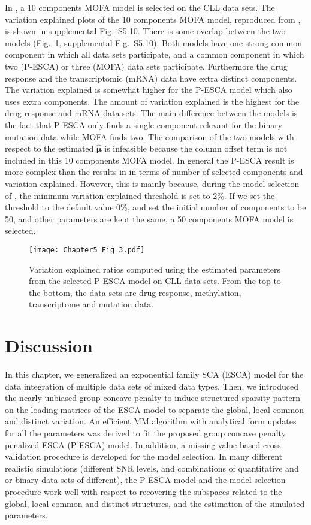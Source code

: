 In \cite{argelaguet2018multi}, a 10 components MOFA model is selected on the CLL data sets. The variation explained plots of the 10 components MOFA model, reproduced from \cite{argelaguet2018multi}, is shown in supplemental Fig.~S5.10. There is some overlap between the two models (Fig.~\ref{chapter5_fig:3}, supplemental Fig.~S5.10). Both models have one strong common component in which all data sets participate, and a common component in which two (P-ESCA) or three (MOFA) data sets participate. Furthermore the drug response and the transcriptomic (mRNA) data have extra distinct components. The variation explained is somewhat higher for the P-ESCA model which also uses extra components. The amount of variation explained is the highest for the drug response and mRNA data sets. The main difference between the models is the fact that P-ESCA only finds a single component relevant for the binary mutation data while MOFA finds two. The comparison of the two models with respect to the estimated $\hat{\bm{\mu}}$ is infeasible because the column offset term is not included in this 10 components MOFA model. In general the P-ESCA result is more complex than the results in \cite{argelaguet2018multi} in terms of number of selected components and variation explained. However, this is mainly because, during the model selection of \cite{argelaguet2018multi}, the minimum variation explained threshold is set to 2\%. If we set the threshold to the default value 0\%, and set the initial number of components to be 50, and other parameters are kept the same, a 50 components MOFA model is selected.

\begin{figure}[h]
    \centering
    \texttt{[image: Chapter5\_Fig\_3.pdf]}
    \caption{Variation explained ratios computed using the estimated parameters from the selected P-ESCA model on CLL data sets. From the top to the bottom, the data sets are drug response, methylation, transcriptome and mutation data.}
	\label{chapter5_fig:3}
\end{figure}

\section{Discussion}
In this chapter, we generalized an exponential family SCA (ESCA) model for the data integration of multiple data sets of mixed data types. Then, we introduced the nearly unbiased group concave penalty to induce structured sparsity pattern on the loading matrices of the ESCA model to separate the global, local common and distinct variation. An efficient MM algorithm with analytical form updates for all the parameters was derived to fit the proposed group concave penalty penalized ESCA (P-ESCA) model. In addition, a missing value based cross validation procedure is developed for the model selection. In many different realistic simulations (different SNR levels, and combinations of quantitative and or binary data sets of different), the P-ESCA model and the model selection procedure work well with respect to recovering the subspaces related to the global, local common and distinct structures, and the estimation of the simulated parameters.

